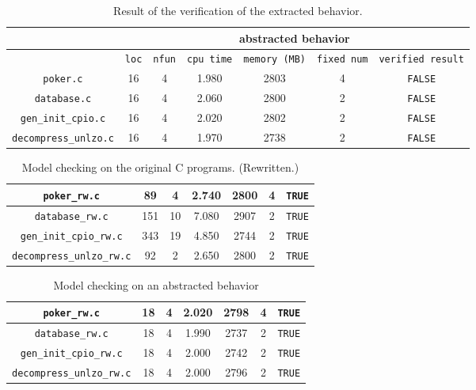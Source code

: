 \begin{table}
  \scriptsize
\begin{tabular}{|c|c|c|c|c|c|c|}
\hline
&\multicolumn{6}{|c|}{abstracted behavior} \\
\hline
 &\texttt{loc} & \texttt{nfun} & \texttt{cpu time} & \texttt{memory (MB)} & \texttt{fixed num} & \texttt{verified result} \\
\hline
\texttt{poker.c} & 16 & 4 & 1.980 & 2803 & 4  & \texttt{FALSE}  \\
\hline
\texttt{database.c} &  16 & 4 & 2.060 & 2800 & 2 & \texttt{FALSE} \\
\hline
\texttt{gen\_init\_cpio.c} & 16 & 4 & 2.020 & 2802 & 2  & \texttt{FALSE}  \\
\hline
\texttt{decompress\_unlzo.c} & 16 & 4 & 1.970  & 2738  & 2  & \texttt{FALSE}  \\
\hline
\end{tabular}
\caption{Result of the verification of the extracted behavior.}
\label{tb:mca}
\end{table}

\begin{table}
  \scriptsize
\begin{tabular}{|c|c|c|c|c|c|c|}
  \hline
\texttt{poker\_rw.c} & 89 & 4 & 2.740 & 2800 & 4  & \texttt{TRUE}  \\
\hline
\texttt{database\_rw.c} & 151 & 10 & 7.080 & 2907 & 2  & \texttt{TRUE}  \\
\hline
\texttt{gen\_init\_cpio\_rw.c} & 343 &19  & 4.850  & 2744  & 2  & \texttt{TRUE}  \\
\hline
\texttt{decompress\_unlzo\_rw.c} & 92 & 2  & 2.650  & 2800  & 2  & \texttt{TRUE}  \\
\hline
\end{tabular}
\caption{Model checking on the original C programs.  (Rewritten.)}
\label{tb:mcarw}
\end{table}

\begin{table}
  \scriptsize
\begin{tabular}{|c|c|c|c|c|c|c|}
  \hline
  \texttt{poker\_rw.c} & 18 & 4 & 2.020 & 2798 & 4  & \texttt{TRUE}  \\
  \hline
  \texttt{database\_rw.c} &  18 & 4 & 1.990 & 2737 & 2 & \texttt{TRUE} \\
  \hline
  \texttt{gen\_init\_cpio\_rw.c} & 18 & 4 & 2.000  & 2742  & 2  & \texttt{TRUE}  \\
  \hline
  \texttt{decompress\_unlzo\_rw.c} & 18 & 4  & 2.000  & 2796  & 2  & \texttt{TRUE}  \\
  \hline
\end{tabular}
\caption{Model checking on an abstracted behavior}
\label{tb:mca}
\end{table}

